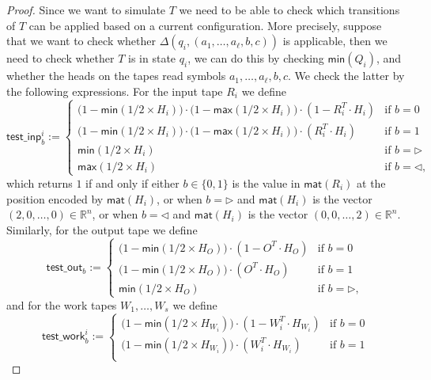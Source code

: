 \begin{proof}
Since we want to simulate $T$ we need to be able to check which 
    transitions of $T$ can be applied based on a current configuration. More precisely,
    suppose that we want to check whether $\Delta(q_i,(a_1,\ldots,a_{\ell},b,c))$ is applicable, then we 
    need to check whether $T$ is in state $q_i$, we can do this by checking 
    $\mathsf{min}(Q_i)$, and whether the heads on the tapes read symbols $a_1,\ldots,a_{\ell},b,c$. We 
    check the latter by the following expressions.
    For the input tape $R_i$ we define
    $$
    \mathsf{test\_inp}^i_b:=\begin{cases}
    \bigl(1-\mathsf{min}(1/2\times H_i)\bigr)\cdot \bigl(1-\mathsf{max}(1/2\times H_i)\bigr)\cdot(1- R_i^T\cdot H_i) & \text{if $b=0$}\\
    \bigl(1-\mathsf{min}(1/2\times H_i)\bigr)\cdot\bigl(1-\mathsf{max}(1/2\times H_i)\bigr)\cdot(R_i^T\cdot H_i) & \text{if $b=1$}\\
    \mathsf{min}(1/2\times H_i) & \text{if $b=\rhd$}\\
    \mathsf{max}(1/2\times H_i) & \text{if $b=\lhd$},
    \end{cases}
    $$
    which returns $1$ if and only if either $b\in\{0,1\}$ is the value in $\mathsf{mat}(R_i)$ at the 
    position encoded by $\mathsf{mat}(H_i)$, or when $b=\rhd$ and $\mathsf{mat}(H_i)$ is the vector 
    $(2,0,\ldots,0)\in\mathbb{R}^n$, or when $b=\lhd$ and $\mathsf{mat}(H_i)$ is the vector 
    $(0,0,\ldots,2)\in\mathbb{R}^n$.
    Similarly, for the output tape we define
    $$
    \mathsf{test\_out}_b:=\begin{cases}
    \bigl(1-\mathsf{min}(1/2\times H_O)\bigr)\cdot(1- O^T\cdot H_O) & \text{if $b=0$}\\
    \bigl(1-\mathsf{min}(1/2\times H_O)\bigr)\cdot(O^T\cdot H_O) & \text{if $b=1$}\\
    \mathsf{min}(1/2\times H_O) & \text{if $b=\rhd$},
    \end{cases}
    $$
    and for the work tapes $W_1,\ldots,W_s$ we define
    $$
    \mathsf{test\_work}^i_b:=\begin{cases}
    \bigl(1-\mathsf{min}(1/2\times H_{W_i})\bigr)\cdot(1- W_i^T\cdot H_{W_i}) & \text{if $b=0$}\\
    \bigl(1-\mathsf{min}(1/2\times H_{W_i})\bigr)\cdot (W_i^T\cdot H_{W_i}) & \text{if $b=1$}\\

\end{cases}$$
\end{proof}
